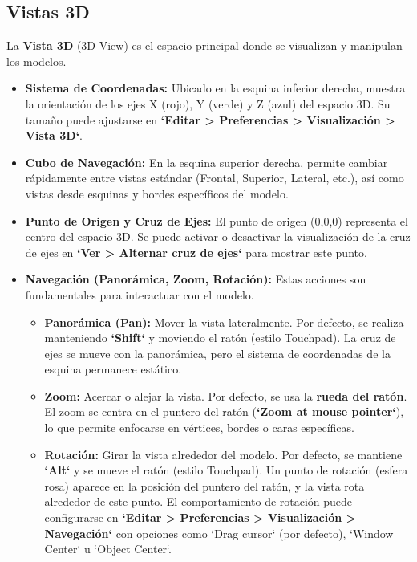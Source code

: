 \documentclass[12pt]{article}
\begin{document}
\subsection{Vistas 3D}
La \textbf{Vista 3D} (3D View) es el espacio principal donde se visualizan y manipulan los modelos.
\begin{itemize}[label=\textbullet]
    \item \textbf{Sistema de Coordenadas:} Ubicado en la esquina inferior derecha, muestra la orientación de los ejes X (rojo), Y (verde) y Z (azul) del espacio 3D. Su tamaño puede ajustarse en \textbf{`Editar > Preferencias > Visualización > Vista 3D`}.
    \item \textbf{Cubo de Navegación:} En la esquina superior derecha, permite cambiar rápidamente entre vistas estándar (Frontal, Superior, Lateral, etc.), así como vistas desde esquinas y bordes específicos del modelo.
    \item \textbf{Punto de Origen y Cruz de Ejes:} El punto de origen (0,0,0) representa el centro del espacio 3D. Se puede activar o desactivar la visualización de la cruz de ejes en \textbf{`Ver > Alternar cruz de ejes`} para mostrar este punto.
    \item \textbf{Navegación (Panorámica, Zoom, Rotación):} Estas acciones son fundamentales para interactuar con el modelo.
    \begin{itemize}[label=\textendash]
        \item \textbf{Panorámica (Pan):} Mover la vista lateralmente. Por defecto, se realiza manteniendo \textbf{`Shift`} y moviendo el ratón (estilo Touchpad). La cruz de ejes se mueve con la panorámica, pero el sistema de coordenadas de la esquina permanece estático.
        \item \textbf{Zoom:} Acercar o alejar la vista. Por defecto, se usa la \textbf{rueda del ratón}. El zoom se centra en el puntero del ratón (\textbf{`Zoom at mouse pointer`}), lo que permite enfocarse en vértices, bordes o caras específicas.
        \item \textbf{Rotación:} Girar la vista alrededor del modelo. Por defecto, se mantiene \textbf{`Alt`} y se mueve el ratón (estilo Touchpad). Un punto de rotación (esfera rosa) aparece en la posición del puntero del ratón, y la vista rota alrededor de este punto. El comportamiento de rotación puede configurarse en \textbf{`Editar > Preferencias > Visualización > Navegación`} con opciones como `Drag cursor` (por defecto), `Window Center` u `Object Center`.
    \end{itemize}

\end{itemize}
\end{document}
